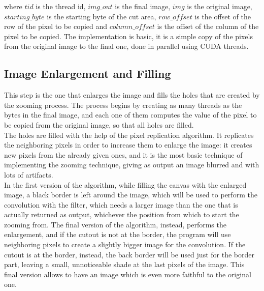     where $tid$ is the thread id, $img\_out$ is the final image, $img$ is the original image, $starting\_byte$ is the starting byte of the cut area, 
    $row\_offset$ is the offset of the row of the pixel to be copied and $column\_offset$ is the offset of the column of the pixel to be copied.
    The implementation is basic, it is a simple copy of the pixels from the original image to the final one, done in parallel using CUDA threads.\\

    \subsection{Image Enlargement and Filling}
    This step is the one that enlarges the image and fills the holes that are created by the zooming process.
    The process begins by creating as many threads as the bytes in the final image, and each one of them computes 
    the value of the pixel to be copied from the original image, so that all holes are filled.\\
    The holes are filled with the help of the pixel replication algorithm. 
    It replicates the neighboring pixels in order to increase them to enlarge the image: it creates new pixels from the already given ones, 
    and it is the most basic technique of implementing the zooming technique, giving as output an image blurred and with lots of artifacts.\\ 
    In the first version of the algorithm, while filling the canvas with the enlarged image, a black border is left around the image,
    which will be used to perform the convolution with the filter, which needs a larger image than the one that is actually returned as output, whichever
    the position from which to start the zooming from.
    The final version of the algorithm, instead, performs the enlargement, and if the cutout is not at the border, the program will use neighboring pixels
    to create a slightly bigger image for the convolution. If the cutout is at the border, instead, the back border will be used just for the border part, 
    leaving a small, unnoticeable shade at the last pixels of the image. This final version allows to have an image which is even more faithful to the original one.\\




